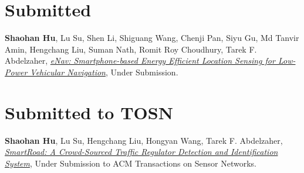 
\section{\sc Submitted}\hypertarget{hu2014sensys}{}
\textbf{Shaohan Hu}, Lu Su, Shen Li, Shiguang Wang, Chenji Pan, Siyu Gu, Md Tanvir Amin,
Hengchang Liu, Suman Nath, Romit Roy Choudhury, Tarek F. Abdelzaher, \href{}{\emph{eNav:
  Smartphone-based Energy Efficient Location Sensing for Low-Power
  Vehicular Navigation}}, \textsf{Under Submission}. %


\section{\sc Submitted to TOSN}\hypertarget{hu2013tosn}{}
\textbf{Shaohan Hu}, Lu Su, Hengchang Liu, Hongyan Wang, Tarek F.
Abdelzaher, \href{}{\emph{SmartRoad: A Crowd-Sourced Traffic
  Regulator Detection and Identification System}}, \textsf{Under Submission to ACM Transactions on Sensor Networks}. %
  
